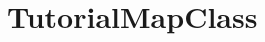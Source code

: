 \hypertarget{group___tutorial_map_class}{}\section{Tutorial\+Map\+Class}
\label{group___tutorial_map_class}
